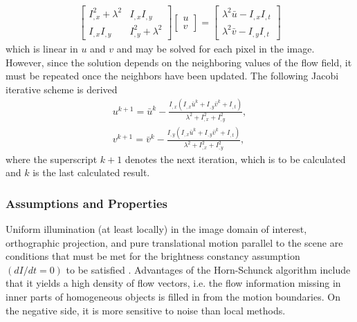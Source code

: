 \documentclass[letterpaper,12pt]{article}
\begin{document}
\begin{align}
\begin{bmatrix}
I_{,x}^2 + \lambda^2 & I_{,x} I_{,y} \\
I_{,x} I_{,y} & I_{,y}^2 + \lambda^2
\end{bmatrix} \begin{bmatrix}
u \\
v
\end{bmatrix} = \begin{bmatrix}
\lambda^2 \bar{u} - I_{,x} I_{,t} \\
\lambda^2 \bar{v} - I_{,y} I_{,t}
\end{bmatrix}
\label{eq:Horn:lagrange-difference-approximation}
\end{align}
which is linear in $u$ and $v$ and may be solved for each pixel in the image. However, since the solution depends on the neighboring values of the flow field, it must be repeated once the neighbors have been updated. The following Jacobi iterative scheme is derived
\begin{subequations}
\begin{align}
u^{k+1} = \bar{u}^{k} - \frac{I_{,x} (I_{,x} \bar{u}^{k} + I_{,y} \bar{v}^{k} + I_{,t}) }{\lambda^2 + I_{,x}^2 + I_{,y}^2},\\
v^{k+1} = \bar{v}^{k} - \frac{I_{,y} (I_{,x} \bar{u}^{k} + I_{,y} \bar{v}^{k} + I_{,t}) }{\lambda^2 + I_{,x}^2 + I_{,y}^2},
\end{align}
\end{subequations}
where the superscript $k+1$ denotes the next iteration, which is to be calculated and $k$ is the last calculated result.
\subsubsection*{Assumptions and Properties}
Uniform illumination (at least locally) in the image domain of interest, orthographic projection, and pure translational motion parallel to the scene are conditions that must be met for the brightness constancy assumption $(dI / dt = 0)$ to be satisfied \citep{Beauchemin:1995}.
Advantages of the Horn-Schunck algorithm include that it yields a high density of flow vectors, i.e. the flow information missing in inner parts of homogeneous objects is filled in from the motion boundaries. On the negative side, it is more sensitive to noise than local methods.
\end{document}
